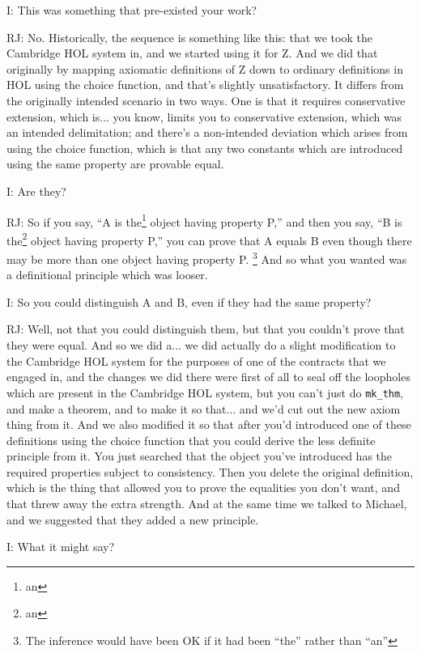 \documentclass[10pt,titlepage]{book}
\begin{document}
I: This was something that pre-existed your work?

RJ: No.
Historically, the sequence is something like this: that we took the Cambridge HOL system in, and we started using it for Z.
And we did that originally by mapping axiomatic definitions of Z down to ordinary definitions in HOL using the choice function, and that's slightly unsatisfactory.
It differs from the originally intended scenario in two ways.
One is that it requires conservative extension, which is... you know, limits you to conservative extension, which was an intended delimitation; and there's a non-intended deviation which arises from using the choice function, which is that any two constants which are introduced using the same property are provable equal.

I: Are they?

RJ: So if you say, ``A is the\footnote{an} object having property P,'' and then you say, ``B is the\footnote{an} object having property P,'' you can prove that A equals B even though there may be more than one object having property P.%
\footnote{The inference would have been OK if it had been ``the'' rather than ``an''}
And so what you wanted was a definitional principle which was looser.

I: So you could distinguish A and B, even if they had the same property?

RJ: Well, not that you could distinguish them, but that you couldn't prove that they were equal.
And so we did a... we did actually do a slight modification to the Cambridge HOL system for the purposes of one of the contracts that we engaged in, and the changes we did there were first of all to seal off the loopholes which are present in the Cambridge HOL system, but you can't just do {\tt mk\_thm}, and make a theorem, and to make it so that... and we'd cut out the new axiom thing from it. And we also modified it so that after you'd introduced one of these definitions using the choice function that you could derive the less definite principle from it. You just searched that the object you've introduced has the required properties subject to consistency. Then you delete the original definition, which is the thing that allowed you to prove the equalities you don't want, and that threw away the extra strength.
And at the same time we talked to Michael, and we suggested that they added a new principle.

I: What it might say?
\end{document}
